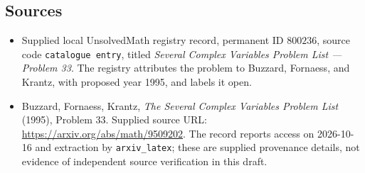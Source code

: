 \documentclass[11pt]{article}
\begin{document}
\subsection{Sources}
\begin{itemize}
\item Supplied local UnsolvedMath registry record, permanent ID \(800236\), source code \texttt{catalogue entry}, titled \emph{Several Complex Variables Problem List --- Problem 33}. The registry attributes the problem to Buzzard, Fornaess, and Krantz, with proposed year 1995, and labels it open.
\item Buzzard, Fornaess, Krantz, \emph{The Several Complex Variables Problem List} (1995), Problem 33. Supplied source URL: \url{https://arxiv.org/abs/math/9509202}. The record reports access on 2026-10-16 and extraction by \texttt{arxiv\_latex}; these are supplied provenance details, not evidence of independent source verification in this draft.
\end{itemize}
\end{document}
